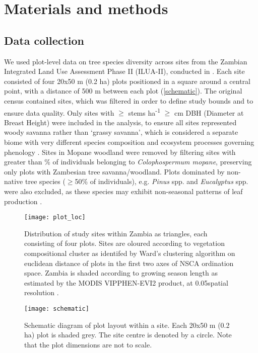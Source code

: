 \documentclass[11pt,a4paper]{article}
\begin{document}
\section{Materials and methods}

\subsection{Data collection}

We used plot-level data on tree species diversity across \nSites{} sites from the Zambian Integrated Land Use Assessment Phase II (ILUA-II), conducted in \censusDate{} \citep{Mukosha2009, Pelletier2018}. Each site consisted of four 20x50 m (0.2 ha) plots positioned in a square around a central point, with a distance of 500 m between each plot (\autoref{schematic}). The original census contained \nTotalSites{} sites, which was filtered in order to define study bounds and to ensure data quality. Only sites with $\geq$\treesHa{} stems ha\textsuperscript{-1} $\geq$\stemSize{} cm DBH (Diameter at Breast Height) were included in the analysis, to ensure all sites represented woody savanna rather than `grassy savanna', which is considered a separate biome with very different species composition and ecosystem processes governing phenology \citep{Parr2014}. Sites in Mopane woodland were removed by filtering sites with greater than \mopanePer{}\% of individuals belonging to \textit{Colophospermum mopane}, preserving only plots with Zambesian tree savanna/woodland. Plots dominated by non-native tree species ($\geq$50\% of individuals), e.g. \textit{Pinus} spp. and \textit{Eucalyptus} spp. were also excluded, as these species may exhibit non-seasonal patterns of leaf production \citep{}.

\begin{figure}[H]
\centering
	\texttt{[image: plot\_loc]}
	\caption{Distribution of study sites within Zambia as triangles, each consisting of four plots. Sites are oloured according to vegetation compositional cluster as identifed by Ward's clustering algorithm on euclidean distance of plots in the first two axes of NSCA ordination space. Zambia is shaded according to growing season length as estimated by the MODIS VIPPHEN-EVI2 product, at 0.05\textdegree spatial resolution \citep{VIPPHEN}.}
	\label{plot_loc}
\end{figure}

\begin{figure}[H]
\centering
	\texttt{[image: schematic]}
	\caption{Schematic diagram of plot layout within a site. Each 20x50 m (0.2 ha) plot is shaded grey. The site centre is denoted by a circle. Note that the plot dimensions are not to scale.}
	\label{schematic}
\end{figure}
\end{document}
